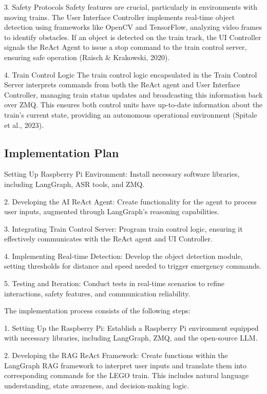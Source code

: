 3. Safety Protocols
Safety features are crucial, particularly in environments with moving trains. The User Interface Controller implements real-time object detection using frameworks like OpenCV and TensorFlow, analyzing video frames to identify obstacles. If an object is detected on the train track, the UI Controller signals the ReAct Agent to issue a stop command to the train control server, ensuring safe operation (Raisch & Krakowski, 2020).

4. Train Control Logic
The train control logic encapsulated in the Train Control Server interprets commands from both the ReAct agent and User Interface Controller, managing train status updates and broadcasting this information back over ZMQ. This ensures both control units have up-to-date information about the train's current state, providing an autonomous operational environment (Spitale et al., 2023).


\subsection{Implementation Plan}
Setting Up Raspberry Pi Environment: Install necessary software libraries, including LangGraph, ASR tools, and ZMQ.

2. Developing the AI ReAct Agent: Create functionality for the agent to process user inputs, augmented through LangGraph’s reasoning capabilities.

3. Integrating Train Control Server: Program train control logic, ensuring it effectively communicates with the ReAct agent and UI Controller.

4. Implementing Real-time Detection: Develop the object detection module, setting thresholds for distance and speed needed to trigger emergency commands.

5. Testing and Iteration: Conduct tests in real-time scenarios to refine interactions, safety features, and communication reliability.



The implementation process consists of the following steps:

1. Setting Up the Raspberry Pi: Establish a Raspberry Pi environment equipped with necessary libraries, including LangGraph, %
ZMQ, and the open-source LLM.

2. Developing the RAG ReAct Framework: Create functions within the LangGraph RAG framework to interpret user inputs and translate them into corresponding commands for the LEGO train. This includes natural language understanding, state awareness, and decision-making logic.

